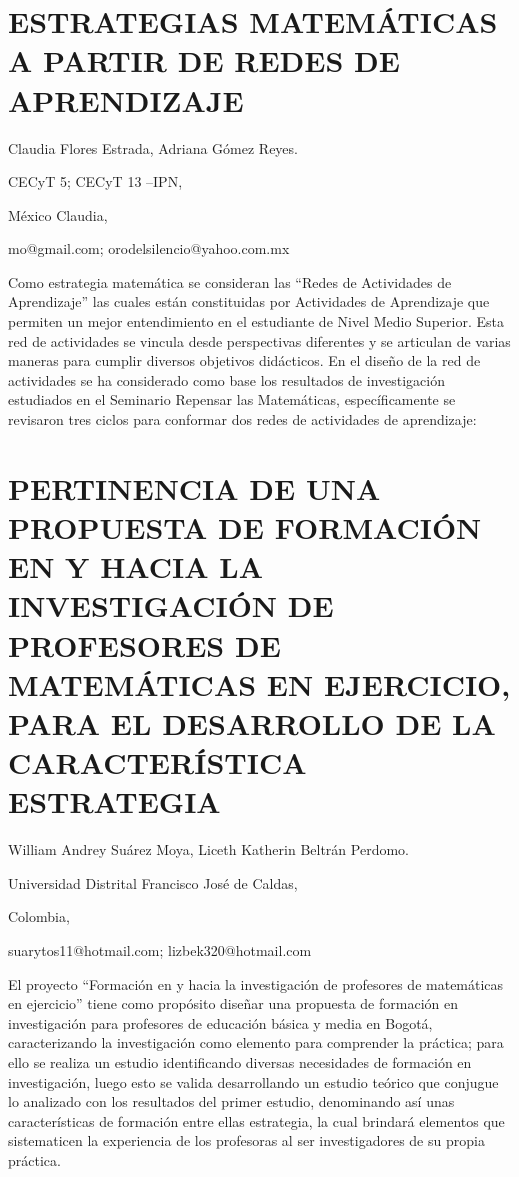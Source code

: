 \section{ESTRATEGIAS MATEMÁTICAS A PARTIR DE REDES DE APRENDIZAJE}

\begin{datos}

Claudia Flores Estrada, Adriana Gómez Reyes.

CECyT 5; CECyT 13 –IPN,

México Claudia,

mo@gmail.com; orodelsilencio@yahoo.com.mx

\end{datos}

Como estrategia matemática se consideran las “Redes de Actividades
de Aprendizaje” las cuales están constituidas por Actividades de Aprendizaje
que permiten un mejor entendimiento en el estudiante de Nivel Medio
Superior. Esta red de actividades se vincula desde perspectivas diferentes
y se articulan de varias maneras para cumplir diversos objetivos didácticos.
En el diseño de la red de actividades se ha considerado como base
los resultados de investigación estudiados en el Seminario Repensar
las Matemáticas, específicamente se revisaron tres ciclos para conformar
dos redes de actividades de aprendizaje: 

\setcounter{section}{253}


\section{PERTINENCIA DE UNA PROPUESTA DE FORMACIÓN EN Y HACIA LA INVESTIGACIÓN
DE PROFESORES DE MATEMÁTICAS EN EJERCICIO, PARA EL DESARROLLO DE LA
CARACTERÍSTICA ESTRATEGIA }

\begin{datos}

William Andrey Suárez Moya, Liceth Katherin Beltrán Perdomo.

Universidad Distrital Francisco José de Caldas,

Colombia,

suarytos11@hotmail.com; lizbek320@hotmail.com 

\end{datos}

El proyecto “Formación en y hacia la investigación de profesores de
matemáticas en ejercicio” tiene como propósito diseñar una propuesta
de formación en investigación para profesores de educación básica
y media en Bogotá, caracterizando la investigación como elemento para
comprender la práctica; para ello se realiza un estudio identificando
diversas necesidades de formación en investigación, luego esto se
valida desarrollando un estudio teórico que conjugue lo analizado
con los resultados del primer estudio, denominando así unas características
de formación entre ellas estrategia, la cual brindará elementos que
sistematicen la experiencia de los profesoras al ser investigadores
de su propia práctica.


